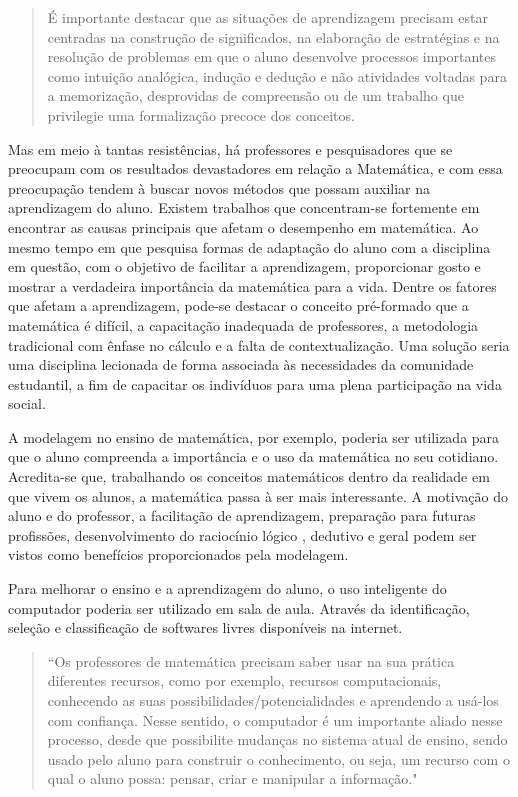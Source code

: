 \documentclass[12pt,a4paper]{article}
\begin{document}
\begin{quote}
É importante destacar que as situações de aprendizagem precisam estar centradas na construção de significados, na elaboração de estratégias e na resolução de problemas em que o aluno desenvolve processos importantes como intuição analógica, indução e dedução e não atividades voltadas para a memorização, desprovidas de compreensão ou de um trabalho que privilegie uma formalização precoce dos conceitos. \citep{nacionais1998ciencias}
\end{quote}
 
Mas em meio à tantas resistências, há professores e pesquisadores que se preocupam com os resultados devastadores em relação a Matemática, e com essa preocupação tendem à buscar novos métodos que possam auxiliar na aprendizagem do aluno.
Existem trabalhos que concentram-se fortemente em encontrar as causas principais que afetam o desempenho em matemática. Ao mesmo tempo em que pesquisa formas de adaptação do aluno com a disciplina em questão, com o objetivo de facilitar a aprendizagem, proporcionar gosto e mostrar a verdadeira importância da matemática para a vida.
Dentre os fatores que afetam a aprendizagem, pode-se destacar o conceito pré-formado que a matemática é difícil, a capacitação inadequada de professores, a metodologia tradicional com ênfase no cálculo e a falta de contextualização. Uma solução seria uma disciplina lecionada de forma associada às necessidades da comunidade estudantil, a fim de capacitar os indivíduos para uma plena participação na vida social. \citep{silva2005refletindo}

A modelagem no ensino de matemática, por exemplo, poderia ser utilizada para que o aluno compreenda a importância e o uso da matemática no seu cotidiano. Acredita-se que, trabalhando os conceitos matemáticos dentro da realidade em que vivem os alunos, a matemática passa à ser mais interessante. A motivação do aluno e do professor, a facilitação de aprendizagem, preparação para futuras profissões, desenvolvimento do raciocínio lógico , dedutivo e geral podem ser vistos como benefícios proporcionados pela modelagem. \citep{silveira2005discussoes}

Para melhorar o ensino e a aprendizagem do aluno, o uso inteligente do computador poderia ser utilizado em sala de aula. Através da identificação, seleção e classificação de softwares livres disponíveis na internet.\citep{dosciatisoftwares}

\begin{quote}
``Os professores de matemática precisam saber usar na sua prática diferentes recursos, como por exemplo, recursos computacionais, conhecendo as suas possibilidades/potencialidades e aprendendo a usá-los com confiança. Nesse sentido, o computador é um importante aliado nesse processo, desde que possibilite mudanças no sistema atual de ensino, sendo usado pelo aluno para construir o conhecimento, ou seja, um recurso com o qual o aluno possa: pensar, criar e manipular a informação." \citep{dosciatisoftwares}
\end{quote}
\end{document}

